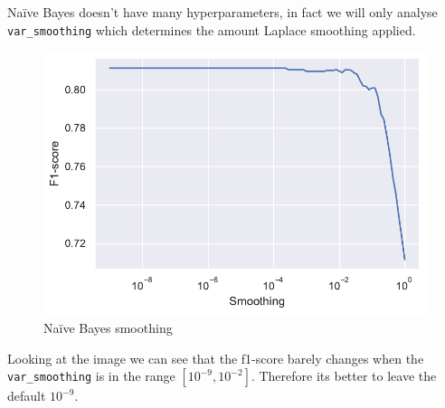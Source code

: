 Na\"ive Bayes doesn't have many hyperparameters, in fact we will only analyse \texttt{var\_smoothing} which determines the amount Laplace smoothing applied.

\begin{figure}[H]
    \centering
    \includegraphics{figures/naive_bayes_smoothing_cv.pdf}
    \caption{Na\"ive Bayes smoothing}%
    \label{fig:naive_bayes_smoothing_cv}
\end{figure}

Looking at the image we can see that the f1-score barely changes when the \texttt{var\_smoothing} is in the range $[10^{-9}, 10^{-2}]$. Therefore its better to leave the default $10^{-9}$.
